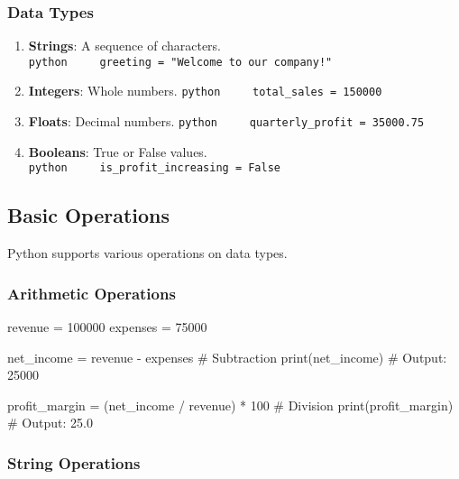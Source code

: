 \documentclass[
  letterpaper,
  DIV=11,
  numbers=noendperiod]{scrreprt}
\newenvironment{Shaded}{\begin{snugshade}}{\end{snugshade}}
\newcommand{\BuiltInTok}[1]{\textcolor[rgb]{0.00,0.23,0.31}{#1}}
\newcommand{\CommentTok}[1]{\textcolor[rgb]{0.37,0.37,0.37}{#1}}
\newcommand{\DecValTok}[1]{\textcolor[rgb]{0.68,0.00,0.00}{#1}}
\newcommand{\NormalTok}[1]{\textcolor[rgb]{0.00,0.23,0.31}{#1}}
\newcommand{\OperatorTok}[1]{\textcolor[rgb]{0.37,0.37,0.37}{#1}}
\providecommand{\tightlist}{%
  \setlength{\itemsep}{0pt}\setlength{\parskip}{0pt}}\usepackage{longtable,booktabs,array}
\begin{document}
\subsubsection{Data Types}\label{data-types}

\begin{enumerate}
\def\labelenumi{\arabic{enumi}.}
\tightlist
\item
  \textbf{Strings}: A sequence of characters.
  \texttt{python\ \ \ \ \ greeting\ =\ "Welcome\ to\ our\ company!"}
\item
  \textbf{Integers}: Whole numbers.
  \texttt{python\ \ \ \ \ total\_sales\ =\ 150000}
\item
  \textbf{Floats}: Decimal numbers.
  \texttt{python\ \ \ \ \ quarterly\_profit\ =\ 35000.75}
\item
  \textbf{Booleans}: True or False values.
  \texttt{python\ \ \ \ \ is\_profit\_increasing\ =\ False}
\end{enumerate}

\subsection{Basic Operations}\label{basic-operations}

Python supports various operations on data types.

\subsubsection{Arithmetic Operations}\label{arithmetic-operations}

\begin{Shaded}
\begin{Highlighting}[]
\NormalTok{revenue }\OperatorTok{=} \DecValTok{100000}
\NormalTok{expenses }\OperatorTok{=} \DecValTok{75000}

\NormalTok{net\_income }\OperatorTok{=}\NormalTok{ revenue }\OperatorTok{{-}}\NormalTok{ expenses  }\CommentTok{\# Subtraction}
\BuiltInTok{print}\NormalTok{(net\_income)  }\CommentTok{\# Output: 25000}

\NormalTok{profit\_margin }\OperatorTok{=}\NormalTok{ (net\_income }\OperatorTok{/}\NormalTok{ revenue) }\OperatorTok{*} \DecValTok{100}  \CommentTok{\# Division}
\BuiltInTok{print}\NormalTok{(profit\_margin)  }\CommentTok{\# Output: 25.0}
\end{Highlighting}
\end{Shaded}

\subsubsection{String Operations}\label{string-operations}
\end{document}
